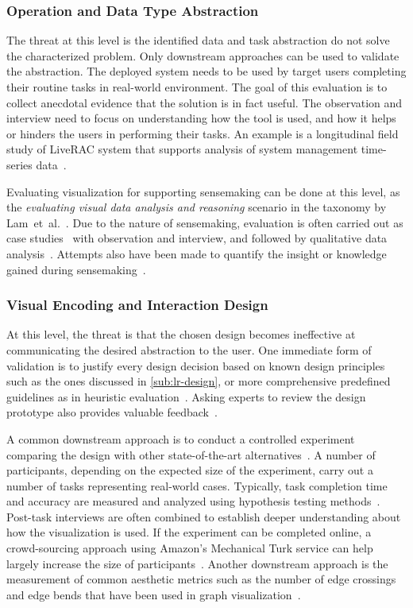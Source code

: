 \subsubsection{Operation and Data Type Abstraction}
The threat at this level is the identified data and task abstraction do not solve the characterized problem. Only downstream approaches can be used to validate the abstraction. The deployed system needs to be used by target users completing their routine tasks in real-world environment. The goal of this evaluation is to collect anecdotal evidence that the solution is in fact useful. The observation and interview need to focus on understanding how the tool is used, and how it helps or hinders the users in performing their tasks. An example is a longitudinal field study of LiveRAC system that supports analysis of system management time-series data~\cite{McLachlan2008}.

Evaluating visualization for supporting sensemaking can be done at this level, as the \emph{evaluating visual data analysis and reasoning} scenario in the taxonomy by Lam~et~al.~\cite{Lam2012}. Due to the nature of sensemaking, evaluation is often carried out as case studies~\cite{Kang2011} with observation and interview, and followed by qualitative data analysis~\cite{Lazar2010}. Attempts also have been made to quantify the insight or knowledge gained during sensemaking~\cite{Wilson2013}.

\subsubsection{Visual Encoding and Interaction Design}
At this level, the threat is that the chosen design becomes ineffective at communicating the desired abstraction to the user. One immediate form of validation is to justify every design decision based on known design principles such as the ones discussed in \autoref{sub:lr-design}, or more comprehensive predefined guidelines as in heuristic evaluation~\cite{Zuk2006}. Asking experts to review the design prototype also provides valuable feedback~\cite{Tory2005}.

A common downstream approach is to conduct a controlled experiment comparing the design with other state-of-the-art alternatives~\cite{Xu2012}. A number of participants, depending on the  expected size of the experiment, carry out a number of tasks representing real-world cases. Typically, task completion time and accuracy are measured and analyzed using hypothesis testing methods~\cite{Field2003}. Post-task interviews are often combined to establish deeper understanding about how the visualization is used. If the experiment can be completed online, a crowd-sourcing approach using Amazon's Mechanical Turk service can help largely increase the size of participants~\cite{Heer2010a}. Another downstream approach is the measurement of common aesthetic metrics such as the number of edge crossings and edge bends that have been used in graph visualization~\cite{Sugiyama1981}.

